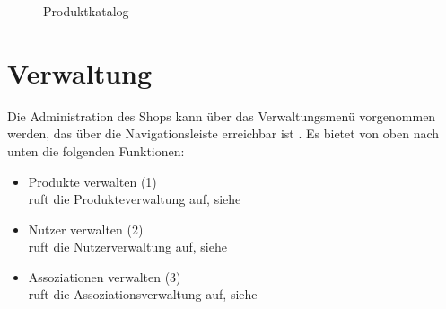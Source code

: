 \begin{figure}[h!]
  \centering
  \caption{Produktkatalog}
  \label{fig:Produktkatalog}
\end{figure}


\section{Verwaltung}
\label{sec:Verwaltung}
Die Administration des Shops kann über das Verwaltungsmenü vorgenommen werden, das über die Navigationsleiste erreichbar ist . Es bietet von oben nach unten die folgenden Funktionen:
\begin{itemize}
  \item Produkte verwalten (1) \\
        ruft die Produkteverwaltung auf, siehe 
  \vspace*{-0.5em}
  \item Nutzer verwalten (2) \\
        ruft die Nutzerverwaltung auf, siehe 
  \item Assoziationen verwalten (3) \\
        ruft die Assoziationsverwaltung auf, siehe 
  \vspace*{-0.5em}
\end{itemize}


